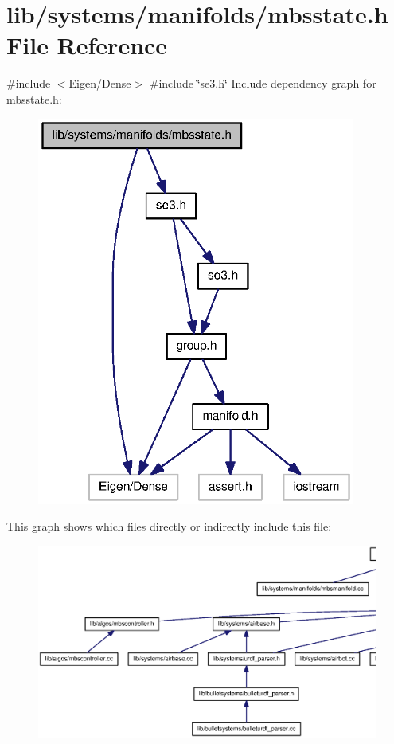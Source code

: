 \section{lib/systems/manifolds/mbsstate.h \-File \-Reference}
\label{mbsstate_8h}
{\ttfamily \#include $<$\-Eigen/\-Dense$>$}\*
{\ttfamily \#include \char`\"{}se3.\-h\char`\"{}}\*
\-Include dependency graph for mbsstate.\-h\-:
\nopagebreak
\begin{figure}[H]
\begin{center}
\leavevmode
\includegraphics[width=297pt]{mbsstate_8h__incl}
\end{center}
\end{figure}
\-This graph shows which files directly or indirectly include this file\-:
\nopagebreak
\begin{figure}[H]
\begin{center}
\leavevmode
\includegraphics[width=350pt]{mbsstate_8h__dep__incl}
\end{center}
\end{figure}
